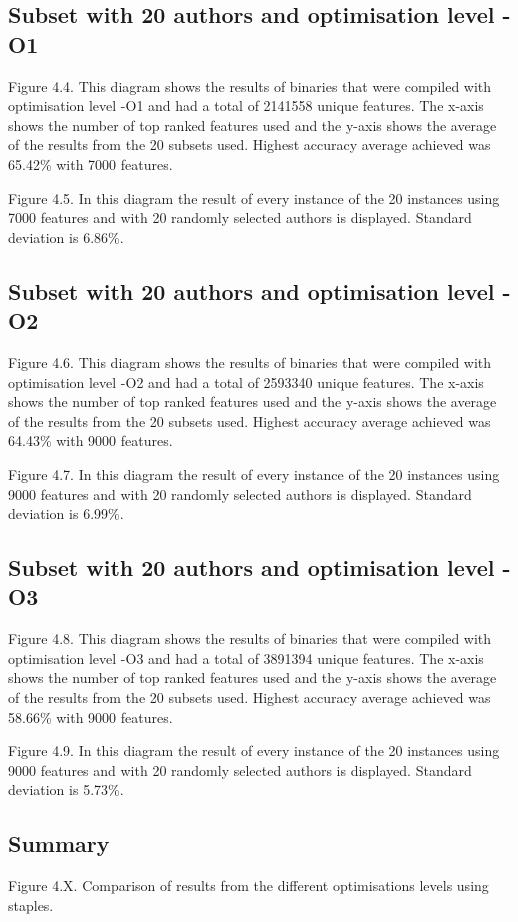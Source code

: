 \documentclass[a4paper,11pt]{kth-mag}
\begin{document}
\subsection{Subset with 20 authors and optimisation level -O1}
Figure 4.4. This diagram shows the results of binaries that were compiled with
optimisation level -O1 and had a total of 2141558 unique features. The x-axis
shows the number of top ranked features used and the y-axis shows the average
of the results from the 20 subsets used. Highest accuracy average achieved was
65.42\% with 7000 features. 


Figure 4.5. In this diagram the result of every instance of the 20 instances
using 7000 features and with 20 randomly selected authors is displayed.
Standard deviation is 6.86\%.

\subsection{Subset with 20 authors and optimisation level -O2}
Figure 4.6. This diagram shows the results of binaries that were compiled with
optimisation level -O2 and had a total of 2593340 unique features. The x-axis
shows the number of top ranked features used and the y-axis shows the average
of the results from the 20 subsets used. Highest accuracy average achieved was
64.43\% with 9000 features.

Figure 4.7. In this diagram the result of every instance of the 20 instances
using 9000 features and with 20 randomly selected authors is displayed.
Standard deviation is 6.99\%.

\subsection{Subset with 20 authors and optimisation level -O3}
Figure 4.8. This diagram shows the results of binaries that were compiled with
optimisation level -O3 and had a total of 3891394 unique features. The x-axis
shows the number of top ranked features used and the y-axis shows the average
of the results from the 20 subsets used. Highest accuracy average achieved was
58.66\% with 9000 features.

Figure 4.9. In this diagram the result of every instance of the 20 instances
using 9000 features and with 20 randomly selected authors is displayed.
Standard deviation is 5.73\%.

\subsection{Summary}
Figure 4.X. Comparison of results from the different optimisations levels using
staples.  
\end{document}
